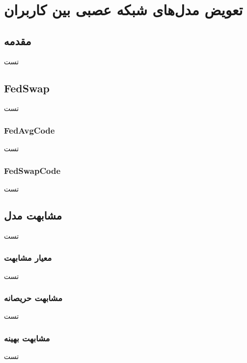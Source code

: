 \chapter{تعویض مدل‌های شبکه عصبی بین کاربران}

\section{مقدمه}
تست

\section{FedSwap}
تست

\subsection{FedAvgCode}
تست

\subsection{FedSwapCode}
تست

\section{مشابهت مدل}
تست

\subsection{معیار مشابهت}
تست

\subsection{مشابهت حریصانه}
تست

\subsection{مشابهت بهینه}
تست





